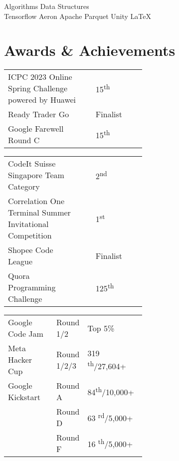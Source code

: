 \documentclass[a4paper,hidelinks]{resume} %
\begin{document}
\begin{minipage}[t]{0.49\textwidth}
    Algorithms \textbullet{}Data Structures\\
    
    Tensorflow \textbullet{} Aeron \textbullet{} Apache Parquet \textbullet{} Unity \textbullet{}\LaTeX\ \\
    
    
    \sectionspace %
    
    
    \section{Awards \& Achievements} 
    
    \sectionspace %
    

    \begin{tabular}{p{0.55\linewidth} p{0\linewidth} l}
        {ICPC 2023 Online Spring \linebreak Challenge powered by Huawei} & & 15\textsuperscript{th} \\
        {Ready Trader Go} & & Finalist \\
        Google Farewell Round C & & 15\textsuperscript{th} \\
    \end{tabular}

    
    \sectionspace %
    
    
    \begin{tabular}{p{0.55\linewidth} p{0\linewidth} l}
        {CodeIt Suisse Singapore Team \linebreak Category} & & 2\textsuperscript{nd} \\
        {Correlation One Terminal Summer Invitational Competition} & & 1\textsuperscript{st} \\
        Shopee Code League & & Finalist \\
        Quora Programming Challenge & & 125\textsuperscript{th} \\
    \end{tabular}
    \begin{tabular}{p{0.35\linewidth} p{0.20\linewidth} l}
        Google Code Jam & Round 1/2 & Top 5\% \\
        Meta Hacker Cup & Round 1/2/3 & 319 \textsuperscript{th}/27,604+ \\
        Google Kickstart & Round A & 84\textsuperscript{th}/10,000+ \\
        & Round D & 63 \textsuperscript{rd}/5,000+ \\
        & Round F & 16 \textsuperscript{th}/5,000+ \\
    \end{tabular}
    

\end{minipage}
\end{document}
